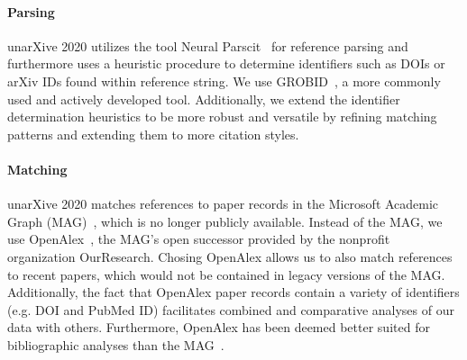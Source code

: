 \paragraph{Parsing} unarXive 2020 utilizes the tool Neural Parscit~\cite{neuralparscit} for reference parsing and furthermore uses a heuristic procedure to determine identifiers such as DOIs or arXiv IDs found within reference string. We use GROBID~\cite{Lopez2009}, a more commonly used and actively developed tool. Additionally, we extend the identifier determination heuristics to be more robust and versatile by refining matching patterns and extending them to more citation styles.

\paragraph{Matching} unarXive 2020 matches references to paper records in the Microsoft Academic Graph (MAG)~\cite{Sinha2015}, which is no longer publicly available. Instead of the MAG, we use OpenAlex~\cite{openalex}, the MAG's open successor provided by the nonprofit organization OurResearch. Chosing OpenAlex allows us to also match references to recent papers, which would not be contained in legacy versions of the MAG. Additionally, the fact that OpenAlex paper records contain a variety of identifiers (e.g. DOI and PubMed ID) facilitates combined and comparative analyses of our data with others. Furthermore, OpenAlex has been deemed better suited for bibliographic analyses than the MAG~\cite{openalex-vs-mag}.




